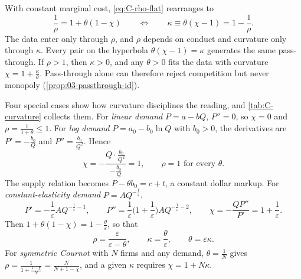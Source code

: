 With constant marginal cost, \eqref{eq:C-rho-flat} rearranges to
\begin{equation}\label{eq:C-kappa}
\frac{1}{\rho} = 1 + \theta(1 - \chi)
\qquad\Longleftrightarrow\qquad
\kappa \equiv \theta(\chi - 1) = 1 - \frac{1}{\rho} .
\end{equation}
The data enter only through $\rho$, and $\rho$ depends on conduct and curvature only through $\kappa$. Every pair on
the hyperbola $\theta(\chi - 1) = \kappa$ generates the same pass-through. If $\rho > 1$, then $\kappa > 0$, and any
$\theta > 0$ fits the data with curvature $\chi = 1 + \frac{\kappa}{\theta}$. Pass-through alone can therefore reject
competition but never monopoly (\cref{prop:03-passthrough-id}).

Four special cases show how curvature disciplines the reading, and \cref{tab:C-curvature} collects them. For
\emph{linear demand} $P = a - bQ$, $P'' = 0$, so $\chi = 0$ and $\rho = \frac{1}{1 + \theta} \le 1$. For \emph{log
demand} $P = a_0 - b_0\ln Q$ with $b_0 > 0$, the derivatives are $P' = -\frac{b_0}{Q}$ and $P'' = \frac{b_0}{Q^2}$.
Hence
\begin{equation*}
\chi = -\frac{Q\cdot\frac{b_0}{Q^2}}{-\frac{b_0}{Q}} = 1 , \qquad \rho = 1 \text{ for every } \theta .
\end{equation*}
The supply relation becomes $P - \theta b_0 = c + t$, a constant dollar markup. For \emph{constant-elasticity demand}
$P = AQ^{-\frac{1}{\varepsilon}}$,
\begin{equation*}
P' = -\frac{1}{\varepsilon}AQ^{-\frac{1}{\varepsilon} - 1}, \qquad
P'' = \frac{1}{\varepsilon}\Big(1 + \frac{1}{\varepsilon}\Big)AQ^{-\frac{1}{\varepsilon} - 2}, \qquad
\chi = -\frac{QP''}{P'} = 1 + \frac{1}{\varepsilon} .
\end{equation*}
Then $1 + \theta(1 - \chi) = 1 - \frac{\theta}{\varepsilon}$, so that
\begin{equation}\label{eq:C-rho-ce}
\rho = \frac{\varepsilon}{\varepsilon - \theta}, \qquad \kappa = \frac{\theta}{\varepsilon}, \qquad
\theta = \varepsilon\kappa .
\end{equation}
For \emph{symmetric Cournot} with $N$ firms and any demand, $\theta = \frac{1}{N}$ gives
$\rho = \frac{1}{1 + \frac{1 - \chi}{N}} = \frac{N}{N + 1 - \chi}$, and a given $\kappa$ requires $\chi = 1 + N\kappa$.

